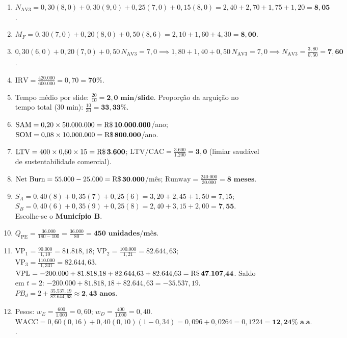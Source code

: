 \begin{boxGabarito}
\begin{enumerate}[leftmargin=1.5em, itemsep=4pt]
  \item $N_{\text{AV3}} = 0{,}30(8{,}0) + 0{,}30(9{,}0) + 0{,}25(7{,}0) + 0{,}15(8{,}0) = 2{,}40 + 2{,}70 + 1{,}75 + 1{,}20 = \mathbf{8{,}05}$.
  \item $M_F = 0{,}30(7{,}0) + 0{,}20(8{,}0) + 0{,}50(8{,}6) = 2{,}10 + 1{,}60 + 4{,}30 = \mathbf{8{,}00}$.
  \item $0{,}30(6{,}0) + 0{,}20(7{,}0) + 0{,}50\,N_{\text{AV3}} = 7{,}0 \implies 1{,}80 + 1{,}40 + 0{,}50\,N_{\text{AV3}} = 7{,}0 \implies N_{\text{AV3}} = \frac{3{,}80}{0{,}50} = \mathbf{7{,}60}$.
  \item $\text{IRV} = \frac{420.000}{600.000} = 0{,}70 = \mathbf{70\%}$.
  \item Tempo médio por slide: $\frac{20}{10} = \mathbf{2{,}0\text{ min/slide}}$. Proporção da arguição no tempo total ($30$ min): $\frac{10}{30} = \mathbf{33{,}33\%}$.
  \item $\text{SAM} = 0{,}20 \times 50.000.000 = \mathbf{\text{R\$\,}{10.000.000}}$/ano; $\text{SOM} = 0{,}08 \times 10.000.000 = \mathbf{\text{R\$\,}{800.000}}$/ano.
  \item $\text{LTV} = 400 \times 0{,}60 \times 15 = \mathbf{\text{R\$\,}{3.600}}$; $\text{LTV/CAC} = \frac{3.600}{1.200} = \mathbf{3{,}0}$ (limiar saudável de sustentabilidade comercial).
  \item $\text{Net Burn} = 55.000 - 25.000 = \mathbf{\text{R\$\,}{30.000}}$/mês; $\text{Runway} = \frac{240.000}{30.000} = \mathbf{8\text{ meses}}$.
  \item $S_A = 0{,}40(8) + 0{,}35(7) + 0{,}25(6) = 3{,}20 + 2{,}45 + 1{,}50 = 7{,}15$; $S_B = 0{,}40(6) + 0{,}35(9) + 0{,}25(8) = 2{,}40 + 3{,}15 + 2{,}00 = \mathbf{7{,}55}$. Escolhe-se o \textbf{Município B}.
  \item $Q_{\text{PE}} = \frac{36.000}{180 - 100} = \frac{36.000}{80} = \mathbf{450\text{ unidades/mês}}$.
  \item $\text{VP}_1 = \frac{90.000}{1{,}10} = 81.818{,}18$; $\text{VP}_2 = \frac{100.000}{1{,}21} = 82.644{,}63$; $\text{VP}_3 = \frac{110.000}{1{,}331} = 82.644{,}63$. $\text{VPL} = -200.000 + 81.818{,}18 + 82.644{,}63 + 82.644{,}63 = \mathbf{\text{R\$\,}{47.107{,}44}}$. Saldo em $t=2$: $-200.000 + 81.818{,}18 + 82.644{,}63 = -35.537{,}19$. $PB_d = 2 + \frac{35.537{,}19}{82.644{,}63} \approx \mathbf{2{,}43\text{ anos}}$.
  \item Pesos: $w_E = \frac{600}{1.000} = 0{,}60$; $w_D = \frac{400}{1.000} = 0{,}40$. $\text{WACC} = 0{,}60(0{,}16) + 0{,}40(0{,}10)(1 - 0{,}34) = 0{,}096 + 0{,}0264 = 0{,}1224 = \mathbf{12{,}24\%\text{ a.a.}}$.

\end{enumerate}
\end{boxGabarito}
